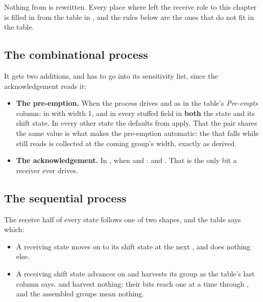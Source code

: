 Nothing from  is rewritten. Every place where  left the receive role
to this chapter is filled in from the table in , and the rules below are the
ones that do not fit in the table.

\subsection*{The combinational process}
It gets two additions, and  has to go into its sensitivity list, since the
acknowledgement reads it:
\begin{itemize}
  \item \textbf{The pre-emption.} When  the process drives 
    and  as in the table's \emph{Pre-empts} column: in  with
    width 1, and in every stuffed field in \textbf{both} the  state and its shift
    state. In every other state the defaults from  apply. That the pair shares the
    same value is what makes the pre-emption automatic: the  that falls while
     still reads  is collected at the coming group's width, exactly as
     derived.
  \item \textbf{The acknowledgement.} In , when  and
    :  and . That is the only bit a
    receiver ever drives.
\end{itemize}

\subsection*{The sequential process}
The receive half of every state follows one of two shapes, and the table says which:
\begin{itemize}
  \item A receiving  state moves on to its shift state at the next
    , and does nothing else.
  \item A receiving shift state advances on  and harvests its group as the table's
    last column says.  and  harvest nothing: their bits reach
     one at a time through , and the assembled groups mean nothing.
\end{itemize}

